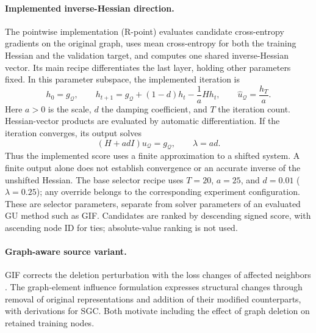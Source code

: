 \paragraph{Implemented inverse-Hessian direction.}
The pointwise implementation (R-point) evaluates candidate cross-entropy gradients on the original graph, uses mean cross-entropy for both the training Hessian and the validation target, and computes one shared inverse-Hessian vector. Its main recipe differentiates the last layer, holding other parameters fixed. In this parameter subspace, the implemented iteration is
\begin{equation}
h_0=g_{\mathcal Q},\qquad
h_{t+1}=g_{\mathcal Q}+(1-d)h_t-\frac{1}{a}Hh_t,
\qquad \widehat u_{\mathcal Q}=\frac{h_T}{a}.
\label{eq:selector-ihvp}
\end{equation}
Here $a>0$ is the scale, $d$ the damping coefficient, and $T$ the iteration count. Hessian-vector products are evaluated by automatic differentiation. If the iteration converges, its output solves
\begin{equation}
(H+adI)u_{\mathcal Q}=g_{\mathcal Q},
\qquad \lambda=ad.
\label{eq:selector-shift}
\end{equation}
Thus the implemented score uses a finite approximation to a shifted system. A finite output alone does not establish convergence or an accurate inverse of the unshifted Hessian. The base selector recipe uses $T=20$, $a=25$, and $d=0.01$ ($\lambda=0.25$); any override belongs to the corresponding experiment configuration. These are selector parameters, separate from solver parameters of an evaluated GU method such as GIF. Candidates are ranked by descending signed score, with ascending node ID for ties; absolute-value ranking is not used.

\paragraph{Graph-aware source variant.}
GIF corrects the deletion perturbation with the loss changes of affected neighbors \citep{wu2023gif}. The graph-element influence formulation \citep{chen2023characterizing} expresses structural changes through removal of original representations and addition of their modified counterparts, with derivations for SGC. Both motivate including the effect of graph deletion on retained training nodes.

